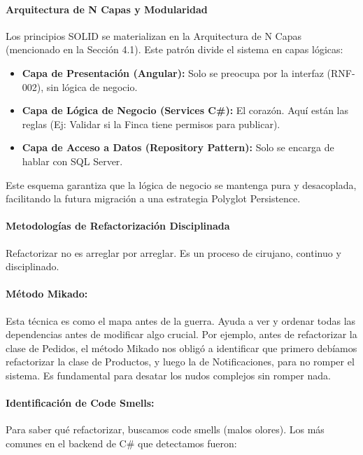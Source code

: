 
\paragraph{Arquitectura de N Capas y Modularidad}

Los principios SOLID se materializan en la Arquitectura de N Capas (mencionado en la Sección 4.1). Este patrón divide el sistema en capas lógicas:

\begin{itemize}
\item \textbf{Capa de Presentación (Angular):} Solo se preocupa por la interfaz (RNF-002), sin lógica de negocio.

\item \textbf{Capa de Lógica de Negocio (Services C\#):} El corazón. Aquí están las reglas (Ej: Validar si la Finca tiene permisos para publicar).

\item \textbf{Capa de Acceso a Datos (Repository Pattern):} Solo se encarga de hablar con SQL Server.
\end{itemize}

Este esquema garantiza que la lógica de negocio se mantenga pura y desacoplada, facilitando la futura migración a una estrategia Polyglot Persistence.


\paragraph{Metodologías de Refactorización Disciplinada}

Refactorizar no es arreglar por arreglar. Es un proceso de cirujano, continuo y disciplinado.

\paragraph{Método Mikado:} Esta técnica es como el mapa antes de la guerra. Ayuda a ver y ordenar todas las dependencias antes de modificar algo crucial. Por ejemplo, antes de refactorizar la clase de Pedidos, el método Mikado nos obligó a identificar que primero debíamos refactorizar la clase de Productos, y luego la de Notificaciones, para no romper el sistema. Es fundamental para desatar los nudos complejos sin romper nada.

\paragraph{Identificación de Code Smells:} Para saber qué refactorizar, buscamos code smells (malos olores). Los más comunes en el backend de C\# que detectamos fueron:

